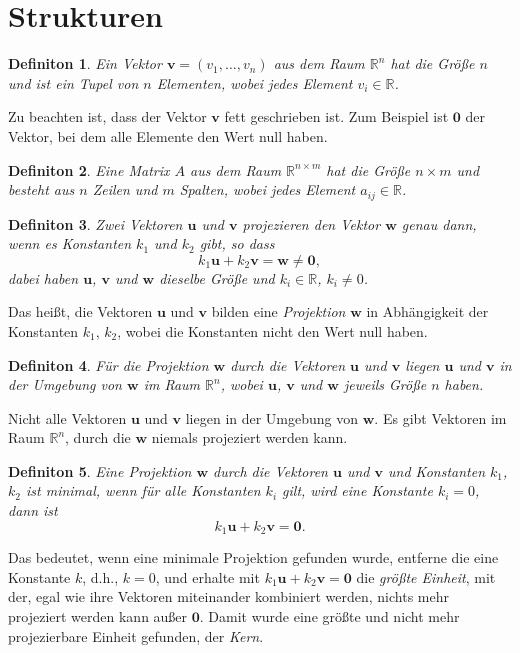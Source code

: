 \documentclass[oneside]{scrbook}
\newtheorem{definition}{Definiton}[section]
\numberwithin{equation}{section}
\begin{document}
\section{Strukturen}
\begin{definition}
	Ein Vektor $\boldsymbol{v} = (v_1, \ldots, v_n)$ aus dem Raum $\mathbb{R}^n$ hat die Größe $n$ und ist ein Tupel von $n$ Elementen, wobei jedes Element $v_i \in \mathbb{R}$.
\end{definition}
Zu beachten ist, dass der Vektor $\boldsymbol{v}$ fett geschrieben ist. Zum Beispiel ist $\boldsymbol{0}$ der Vektor, bei dem alle Elemente den Wert null haben.
\begin{definition}
	Eine Matrix $A$ aus dem Raum $\mathbb{R}^{n \times m}$ hat die Größe $n \times m$ und besteht aus $n$ Zeilen und $m$ Spalten, wobei jedes Element $a_{ij} \in \mathbb{R}$.
\end{definition}
\begin{definition}
   	Zwei Vektoren $\boldsymbol{u}$ und $\boldsymbol{v}$ projezieren den Vektor $\boldsymbol{w}$ genau dann, wenn es Konstanten $k_1$ und $k_2$ gibt, so dass $$k_1 \boldsymbol{u} + k_2\boldsymbol{v} = \boldsymbol{w} \neq \boldsymbol{0},$$ dabei haben $\boldsymbol{u}$, $\boldsymbol{v}$ und $\boldsymbol{w}$ dieselbe Größe und $k_i \in \mathbb{R}$, $k_i \neq 0$.
\end{definition}
Das heißt, die Vektoren $\boldsymbol{u}$ und $\boldsymbol{v}$ bilden eine \textit{Projektion} $\boldsymbol{w}$ in Abhängigkeit der Konstanten $k_1$, $k_2$, wobei die Konstanten nicht den Wert null haben.
\begin{definition}
	Für die Projektion $\boldsymbol{w}$ durch die Vektoren $\boldsymbol{u}$ und $\boldsymbol{v}$ liegen $\boldsymbol{u}$ und $\boldsymbol{v}$ in der Umgebung von $\boldsymbol{w}$ im Raum $\mathbb{R}^n$, wobei $\boldsymbol{u}$, $\boldsymbol{v}$ und $\boldsymbol{w}$ jeweils Größe $n$ haben.
\end{definition}
Nicht alle Vektoren $\boldsymbol{u}$ und $\boldsymbol{v}$ liegen in der Umgebung von $\boldsymbol{w}$. Es gibt Vektoren im Raum $\mathbb{R}^n$, durch die $\boldsymbol{w}$ niemals projeziert werden kann.
\begin{definition}
	Eine Projektion $\boldsymbol{w}$ durch die Vektoren $\boldsymbol{u}$ und $\boldsymbol{v}$ und Konstanten $k_1$, $k_2$ ist minimal, wenn für alle Konstanten $k_i$ gilt, wird eine Konstante $k_i = 0$, dann ist $$k_1 \boldsymbol{u} + k_2\boldsymbol{v} = \boldsymbol{0}.$$
\end{definition}
Das bedeutet, wenn eine minimale Projektion gefunden wurde, entferne die eine Konstante $k$, d.h., $k = 0$, und erhalte mit $k_1 \boldsymbol{u} + k_2\boldsymbol{v} = \boldsymbol{0}$ die \textit{größte Einheit}, mit der, egal wie ihre Vektoren miteinander kombiniert werden, nichts mehr projeziert werden kann außer $\boldsymbol{0}$. Damit wurde eine größte und nicht mehr projezierbare Einheit gefunden, der \textit{Kern}.
\end{document}
